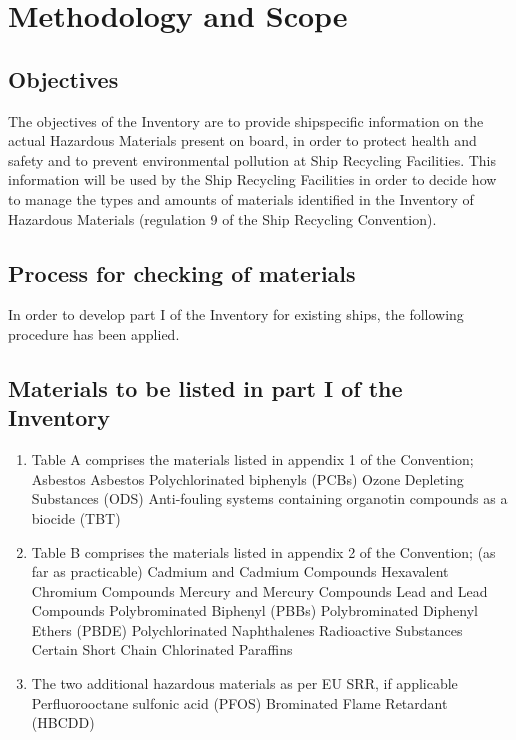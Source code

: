 \documentclass{article}
\begin{document}
\newpage
\section{Methodology and Scope}

\subsection{Objectives}
The objectives of the Inventory are to provide shipspecific information on the
actual Hazardous Materials present on board, in order to protect health and
safety and to prevent environmental pollution at Ship Recycling Facilities. This
information will be used by the Ship Recycling Facilities in order to decide how to
manage the types and amounts of materials identified in the Inventory of
Hazardous Materials (regulation 9 of the Ship Recycling Convention).

\subsection{Process for checking of materials}
In order to develop part I of the Inventory for existing ships, the following
procedure has been applied.
\subsection{Materials to be listed in part I of the Inventory}
\begin{enumerate}
\item Table A comprises the materials listed in appendix 1 of the Convention;
Asbestos
\subitem Asbestos
\subitem Polychlorinated biphenyls (PCBs)
\subitem Ozone Depleting Substances (ODS)
\subitem Anti-fouling systems containing organotin compounds as a biocide (TBT)
\item Table B comprises the materials listed in appendix 2 of the Convention; (as
far as practicable)
\subitem Cadmium and Cadmium Compounds
\subitem Hexavalent Chromium Compounds
\subitem Mercury and Mercury Compounds
\subitem Lead and Lead Compounds
\subitem Polybrominated Biphenyl (PBBs)
\subitem Polybrominated Diphenyl Ethers (PBDE)
\subitem Polychlorinated Naphthalenes
\subitem Radioactive Substances
\subitem Certain Short Chain Chlorinated Paraffins
\item The two additional hazardous materials as per EU SRR, if applicable
\subitem Perfluorooctane sulfonic acid (PFOS)
\subitem Brominated Flame Retardant (HBCDD)

\end{enumerate}
\end{document}
